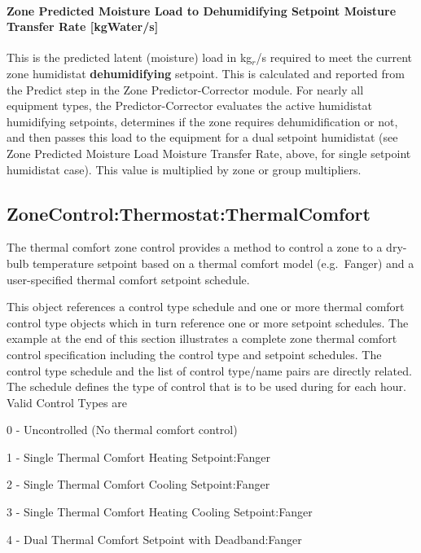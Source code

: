 \paragraph{Zone Predicted Moisture Load to Dehumidifying Setpoint Moisture Transfer Rate {[}kgWater/s{]}}\label{zone-predicted-moisture-load-to-dehumidifying-setpoint-moisture-transfer-rate-kgwaters}

This is the predicted latent (moisture) load in kg\(_{r}\)/s required to meet the current zone humidistat \textbf{dehumidifying} setpoint. This is calculated and reported from the Predict step in the Zone Predictor-Corrector module. For nearly all equipment types, the Predictor-Corrector evaluates the active humidistat humidifying setpoints, determines if the zone requires dehumidification or not, and then passes this load to the equipment for a dual setpoint humidistat (see Zone Predicted Moisture Load Moisture Transfer Rate, above, for single setpoint humidistat case). This value is multiplied by zone or group multipliers.

\subsection{ZoneControl:Thermostat:ThermalComfort}\label{zonecontrolthermostatthermalcomfort}

The thermal comfort zone control provides a method to control a zone to a dry-bulb temperature setpoint based on a thermal comfort model (e.g.~Fanger) and a user-specified thermal comfort setpoint schedule.

This object references a control type schedule and one or more thermal comfort control type objects which in turn reference one or more setpoint schedules. The example at the end of this section illustrates a complete zone thermal comfort control specification including the control type and setpoint schedules. The control type schedule and the list of control type/name pairs are directly related. The schedule defines the type of control that is to be used during for each hour. Valid Control Types are

0 - Uncontrolled (No thermal comfort control)

1 - Single Thermal Comfort Heating Setpoint:Fanger

2 - Single Thermal Comfort Cooling Setpoint:Fanger

3 - Single Thermal Comfort Heating Cooling Setpoint:Fanger

4 - Dual Thermal Comfort Setpoint with Deadband:Fanger


